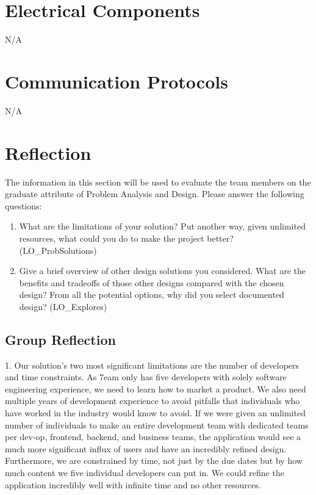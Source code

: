 \documentclass[12pt, titlepage]{article}
\begin{document}
\section{Electrical Components}
N/A

\section{Communication Protocols}
N/A

\section{Reflection}

The information in this section will be used to evaluate the team members on the
graduate attribute of Problem Analysis and Design.  Please answer the following questions:

\begin{enumerate}
  \item What are the limitations of your solution?  Put another way, given
  unlimited resources, what could you do to make the project better? (LO\_ProbSolutions)
  \item Give a brief overview of other design solutions you considered.  What
  are the benefits and tradeoffs of those other designs compared with the chosen
  design?  From all the potential options, why did you select documented design?
  (LO\_Explores)
\end{enumerate}

\subsection{Group Reflection}
1. Our solution's two most significant limitations are the number of developers and time constraints. As 7eam only has five developers with solely software engineering experience, we need to learn how to market a product. We also need multiple years of development experience to avoid pitfalls that individuals who have worked in the industry would know to avoid. If we were given an unlimited number of individuals to make an entire development team with dedicated teams per dev-op, frontend, backend, and business teams, the application would see a much more significant influx of users and have an incredibly refined design. Furthermore, we are constrained by time, not just by the due dates but by how much content we five individual developers can put in. We could refine the application incredibly well with infinite time and no other resources. 
	
\end{document}
